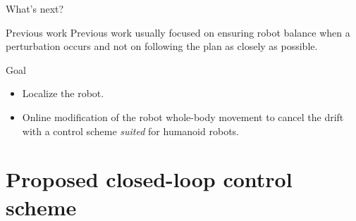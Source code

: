 \documentclass[hyperref={pdfpagelabels=false}]{beamer}
\begin{document}
\begin{frame}{What's next?}

  \begin{block}{Previous work}
    Previous work usually focused on ensuring robot balance when a
    perturbation occurs and not on following the plan as closely as
    possible.\\

    \footnotesize
    \cite{07icra.morisawa}
  \end{block}

  \begin{block}{Goal}
    \begin{itemize}
    \item Localize the robot.
    \item Online modification of the robot whole-body movement to
      cancel the drift with a control scheme \emph{suited} for
      humanoid robots.
    \end{itemize}
  \end{block}


\end{frame}


\section{Proposed closed-loop control scheme}
\end{document}
